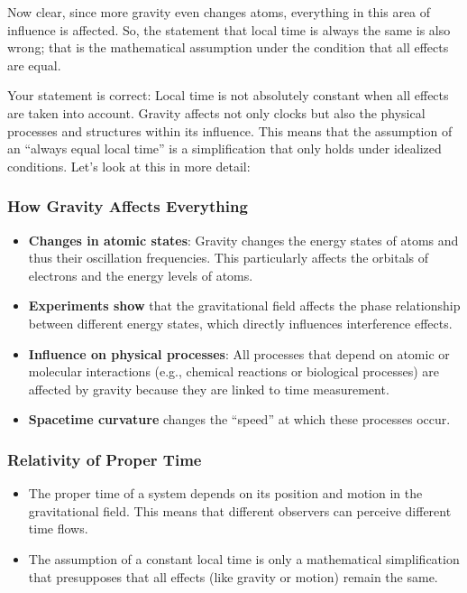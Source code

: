 \documentclass[a4paper,12pt]{article}
\begin{document}
	Now clear, since more gravity even changes atoms, everything in this area of influence is affected. So, the statement that local time is always the same is also wrong; that is the mathematical assumption under the condition that all effects are equal.
	
	Your statement is correct: Local time is not absolutely constant when all effects are taken into account. Gravity affects not only clocks but also the physical processes and structures within its influence. This means that the assumption of an ``always equal local time'' is a simplification that only holds under idealized conditions. Let's look at this in more detail:
	
	\subsubsection{How Gravity Affects Everything}
	\begin{itemize}
		\item \textbf{Changes in atomic states}: Gravity changes the energy states of atoms and thus their oscillation frequencies. This particularly affects the orbitals of electrons and the energy levels of atoms.
		\item \textbf{Experiments show} that the gravitational field affects the phase relationship between different energy states, which directly influences interference effects.
		\item \textbf{Influence on physical processes}: All processes that depend on atomic or molecular interactions (e.g., chemical reactions or biological processes) are affected by gravity because they are linked to time measurement.
		\item \textbf{Spacetime curvature} changes the ``speed'' at which these processes occur.
	\end{itemize}
	
	\subsubsection{Relativity of Proper Time}
	\begin{itemize}
		\item The proper time of a system depends on its position and motion in the gravitational field. This means that different observers can perceive different time flows.
		\item The assumption of a constant local time is only a mathematical simplification that presupposes that all effects (like gravity or motion) remain the same.
	\end{itemize}
	
\end{document}
